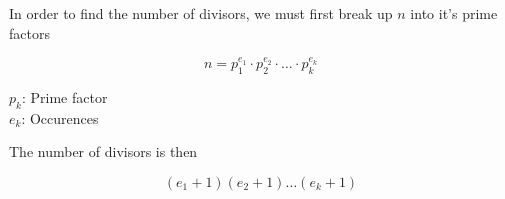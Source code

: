 \documentclass[../../Main.tex]{subfiles}
\begin{document}
In order to find the number of divisors, we must first break up $n$ into it's prime factors

$$n = p_1^{e_1} \cdot p_2^{e_2} \cdot \ldots \cdot p_k^{e_k}$$

\begin{center}
    $p_k$: Prime factor \\
    $e_k$: Occurences
\end{center}

The number of divisors is then

$$(e_1 + 1)(e_2 + 1) \ldots (e_k + 1)$$

\end{document}
